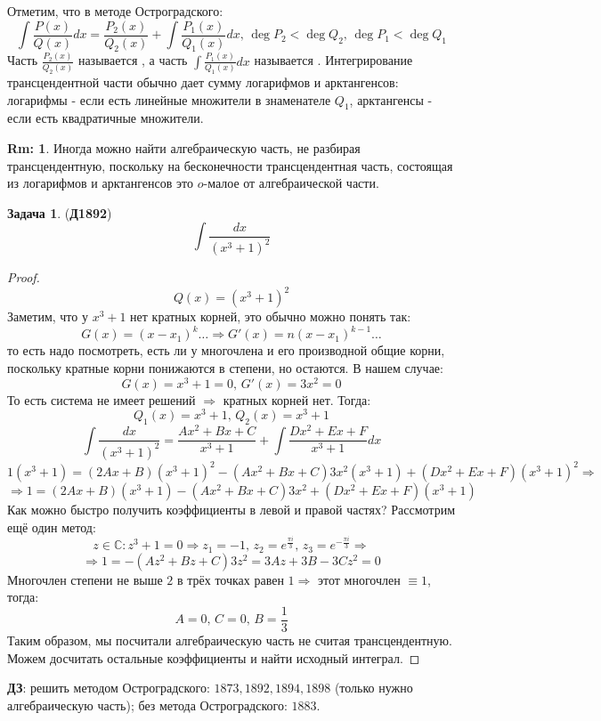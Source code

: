 \documentclass[12pt]{article}
\newcommand{\MC}{\mathbb{C}}
\theoremstyle{definition}
\newtheorem{rem}{Rm:}
\newtheorem{problem}{Задача}
\DeclareMathOperator{\dint}{\displaystyle\int}
\begin{document}
Отметим, что в методе Остроградского:
$$
	\dint \dfrac{P(x)}{Q(x)}dx = \dfrac{P_2(x)}{Q_2(x)} + \dint \dfrac{P_1(x)}{Q_1(x)}dx, \, \deg{P_2} < \deg{Q_2}, \, \deg{P_1} < \deg{Q_1}
$$
Часть $\frac{P_2(x)}{Q_2(x)}$ называется , а часть $\int \frac{P_1(x)}{Q_1(x)}dx$ называется . Интегрирование трансцендентной части обычно дает сумму логарифмов и арктангенсов: логарифмы - если есть линейные множители в знаменателе $Q_1$, арктангенсы - если есть квадратичные множители.
\begin{rem}
	Иногда можно найти алгебраическую часть, не разбирая трансцендентную, поскольку на бесконечности трансцендентная часть, состоящая из логарифмов и арктангенсов это $o$-малое от алгебраической части.
\end{rem}

\begin{problem}(\textbf{Д1892})
	$$
		\dint \dfrac{dx}{(x^3 + 1)^2 }
	$$
\end{problem}
\begin{proof}
	$$
		Q(x) = (x^3 + 1)^2
	$$
	Заметим, что у $x^3 + 1$ нет кратных корней, это обычно можно понять так:
	$$
		G(x) = (x- x_1)^k\dotsc \Rightarrow G'(x) = n(x - x_1)^{k-1}\dotsc
	$$
	то есть надо посмотреть, есть ли у многочлена и его производной общие корни, поскольку кратные корни понижаются в степени, но остаются. В нашем случае:
	$$
		G(x) = x^3 + 1 = 0, \, G'(x) = 3x^2 = 0
	$$
	То есть система не имеет решений $\Rightarrow$ кратных корней нет. Тогда:
	$$
		Q_1(x) = x^3 + 1, \, Q_2(x) = x^3 + 1
	$$
	$$
		\dint \dfrac{dx}{(x^3 + 1)^2 } = \dfrac{Ax^2 + Bx + C}{x^3 +1} + \dint\dfrac{Dx^2 + Ex + F}{x^3 + 1}dx
	$$
	$$
		1(x^3 + 1) = (2Ax + B)(x^3 + 1)^2 - (Ax^2 + Bx + C)3x^2(x^3 + 1) + (Dx^2 + Ex + F)(x^3 +1)^2 \Rightarrow
	$$
	$$
		\Rightarrow 1 = (2Ax + B) (x^3+1) - (Ax^2 + Bx +C)3x^2 +(Dx^2 + Ex +F)(x^3 +1)
	$$
	Как можно быстро получить коэффициенты в левой и правой частях? Рассмотрим ещё один метод:
	$$
		z \in \MC \colon z^3 + 1 = 0 \Rightarrow z_1 = -1, \, z_2 = e^{\frac{\pi i}{3}}, \, z_3 = e^{-\frac{\pi i}{3}} \Rightarrow
	$$
	$$
		\Rightarrow 1 = -(Az^2 + Bz + C)3z^2 = 3Az + 3B - 3Cz^2 = 0
	$$
	Многочлен степени не выше $2$ в трёх точках равен $1 \Rightarrow$ этот многочлен $\equiv 1$, тогда:
	$$
		A = 0, \, C = 0, \, B = \dfrac{1}{3} 
	$$
	Таким образом, мы посчитали алгебраическую часть не считая трансцендентную. Можем досчитать остальные коэффициенты и найти исходный интеграл.
\end{proof}

\textbf{ДЗ}: решить методом Остроградского: $1873, 1892, 1894, 1898$ (только нужно алгебраическую часть); без метода Остроградского: $1883$.
\end{document}
